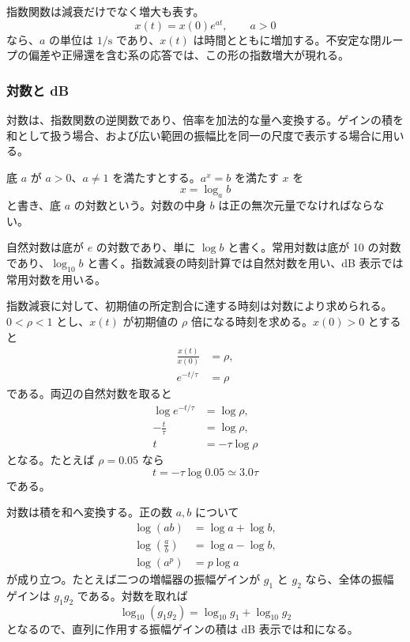 指数関数は減衰だけでなく増大も表す。
\begin{equation}
  x(t)=x(0)e^{at},\qquad a>0
\end{equation}
なら、$a$ の単位は $1/\mathrm{s}$ であり、$x(t)$ は時間とともに増加する。不安定な閉ループの偏差や正帰還を含む系の応答では、この形の指数増大が現れる。

\subsubsection{対数と dB}

対数は、指数関数の逆関数であり、倍率を加法的な量へ変換する。ゲインの積を和として扱う場合、および広い範囲の振幅比を同一の尺度で表示する場合に用いる。

\begin{definition}[対数]
底 $a$ が $a>0$、$a\ne1$ を満たすとする。$a^x=b$ を満たす $x$ を
\begin{equation}
  x=\log_a b
\end{equation}
と書き、底 $a$ の対数という。対数の中身 $b$ は正の無次元量でなければならない。
\end{definition}

自然対数は底が $e$ の対数であり、単に $\log b$ と書く。常用対数は底が 10 の対数であり、$\log_{10}b$ と書く。指数減衰の時刻計算では自然対数を用い、dB 表示では常用対数を用いる。

指数減衰に対して、初期値の所定割合に達する時刻は対数により求められる。$0<\rho<1$ とし、$x(t)$ が初期値の $\rho$ 倍になる時刻を求める。$x(0)>0$ とすると
\begin{align}
  \frac{x(t)}{x(0)}&=\rho,\\
  e^{-t/\tau}&=\rho
\end{align}
である。両辺の自然対数を取ると
\begin{align}
  \log e^{-t/\tau}&=\log \rho,\\
  -\frac{t}{\tau}&=\log \rho,\\
  t&=-\tau\log \rho
\end{align}
となる。たとえば $\rho=0.05$ なら
\begin{equation}
  t=-\tau\log 0.05\simeq3.0\tau
\end{equation}
である。

対数は積を和へ変換する。正の数 $a,b$ について
\begin{align}
  \log(ab)&=\log a+\log b,\\
  \log\left(\frac{a}{b}\right)&=\log a-\log b,\\
  \log(a^p)&=p\log a
\end{align}
が成り立つ。たとえば二つの増幅器の振幅ゲインが $g_1$ と $g_2$ なら、全体の振幅ゲインは $g_1g_2$ である。対数を取れば
\begin{equation}
  \log_{10}(g_1g_2)=\log_{10}g_1+\log_{10}g_2
\end{equation}
となるので、直列に作用する振幅ゲインの積は dB 表示では和になる。

